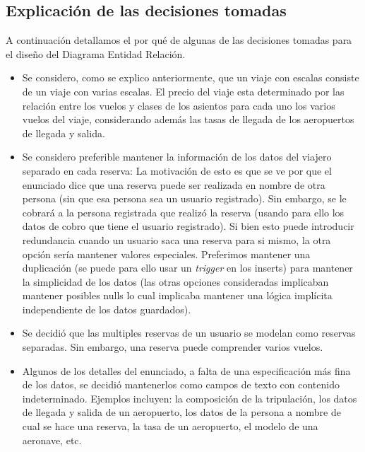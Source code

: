 \subsection{Explicaci\'on de las decisiones tomadas}

A continuaci\'on detallamos el por qu\'e de algunas de las decisiones tomadas para el diseño del Diagrama Entidad Relaci\'on.

\begin{itemize}
	\item Se considero, como se explico anteriormente, que un viaje con escalas consiste de un viaje con varias escalas. El
	precio del viaje esta determinado por las relaci\'on entre los vuelos y clases de los asientos para cada uno los varios 
	vuelos del viaje, considerando adem\'as las tasas de llegada de los aeropuertos de llegada y salida.
	\item Se considero preferible mantener la informaci\'on de los datos del viajero separado en cada reserva: La motivaci\'on
	de esto es que se ve por que el enunciado dice que una reserva puede ser realizada en nombre de otra persona (sin que esa
	persona sea un usuario registrado). Sin embargo, se le cobrar\'a a la persona registrada que realiz\'o la reserva (usando
	para ello los datos de cobro que tiene el usuario registrado). Si bien esto puede introducir redundancia cuando un usuario
	saca una reserva para si mismo, la otra opci\'on ser\'ia mantener valores especiales. Preferimos mantener una duplicaci\'on
	(se puede para ello usar un \textit{trigger} en los inserts) para mantener la simplicidad de los datos (las otras opciones
	consideradas implicaban mantener posibles nulls lo cual implicaba mantener una l\'ogica impl\'icita independiente de los
	datos guardados).
	\item Se decidi\'o que las multiples reservas de un usuario se modelan como reservas separadas. Sin embargo, una reserva
	puede comprender varios vuelos.
	\item Algunos de los detalles del enunciado, a falta de una especificaci\'on m\'as fina de los datos, se decidi\'o mantenerlos
	como campos de texto con contenido indeterminado. Ejemplos incluyen: la composici\'on de la tripulaci\'on, los datos de llegada
	y salida de un aeropuerto, los datos de la persona a nombre de cual se hace una reserva, la tasa de un aeropuerto, el modelo
	de una aeronave, etc.
\end{itemize}	
